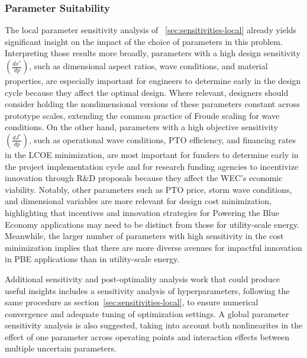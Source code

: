 \subsubsection{Parameter Suitability}
The local parameter sensitivity analysis of \sectionautorefname~\ref{sec:sensitivities-local} already yields significant insight on the impact of the choice of parameters in this problem.
Interpreting those results more broadly, parameters with a high design sensitivity $\left(\frac{dx^*}{dp}\right)$, such as dimensional aspect ratios, wave conditions, and material properties, are especially important for engineers to determine early in the design cycle because they affect the optimal design. 
Where relevant, designers should consider holding the nondimensional versions of these parameters constant across prototype scales, extending the common practice of Froude scaling for wave conditions.
On the other hand, parameters with a high objective sensitivity $\left(\frac{dJ^*}{dp}\right)$, such as operational wave conditions, PTO efficiency, and financing rates in the LCOE minimization, are most important for funders to determine early in the project implementation cycle and for research funding agencies to incentivize innovation through R\&D proposals because they affect the WEC's economic viability.
Notably, other parameters such as PTO price, storm wave conditions, and dimensional variables are more relevant for design cost minimization, highlighting that incentives and innovation strategies for Powering the Blue Economy applications may need to be distinct from those for utility-scale energy.
Meanwhile, the larger number of parameters with high sensitivity in the cost minimization implies that there are more diverse avenues for impactful innovation in PBE applications than in utility-scale energy.

Additional sensitivity and post-optimality analysis work that could produce useful insights includes a sensitivity analysis of hyperparameters, following the same procedure as section~\ref{sec:sensitivities-local}, to ensure numerical convergence and adequate tuning of optimization settings.
A global parameter sensitivity analysis is also suggested, taking into account both nonlinearites in the effect of one parameter across operating points and interaction effects between multiple uncertain parameters.

